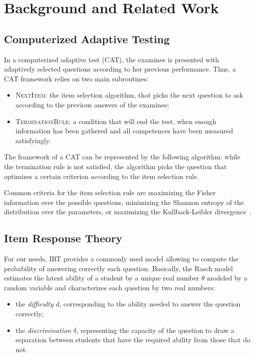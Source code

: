 \documentclass{edm_template}
\begin{document}
\section{Background and Related Work}

\subsection{Computerized Adaptive Testing}

In a computerized adaptive test (CAT), the examinee is presented with adaptively selected questions according to her previous performance. Thus, a CAT framework relies on two main subroutines:
\begin{itemize}
\item \textsc{NextItem}: the item selection algorithm, that picks the next question to ask according to the previous answers of the examinee;
\item \textsc{TerminationRule}: a condition that will end the test, when enough information has been gathered and all competences have been measured satisfyingly.
\end{itemize}

The framework of a CAT can be represented by the following algorithm: while the termination rule is not satisfied, the algorithm picks the question that optimizes a certain criterion according to the item selection rule.

Common criteria for the item selection rule are maximizing the Fisher information over the possible questions, minimizing the Shannon entropy of the distribution over the parameters, or maximizing the Kullback-Leibler divergence~\cite{Xu2003}. %

\subsection{Item Response Theory}

For our needs, IRT provides a commonly used model allowing to compute the probability of answering correctly each question. Basically, the Rasch model estimates the latent ability of a student by a unique real number $\theta$ modeled by a random variable and characterizes each question by two real numbers:

\begin{itemize}
\item the \emph{difficulty} $d$, corresponding to the ability needed to answer the question correctly;
\item the \emph{discrimination} $\delta$, representing the capacity of the question to draw a separation between students that have the required ability from those that do not.
\end{itemize}
\end{document}
